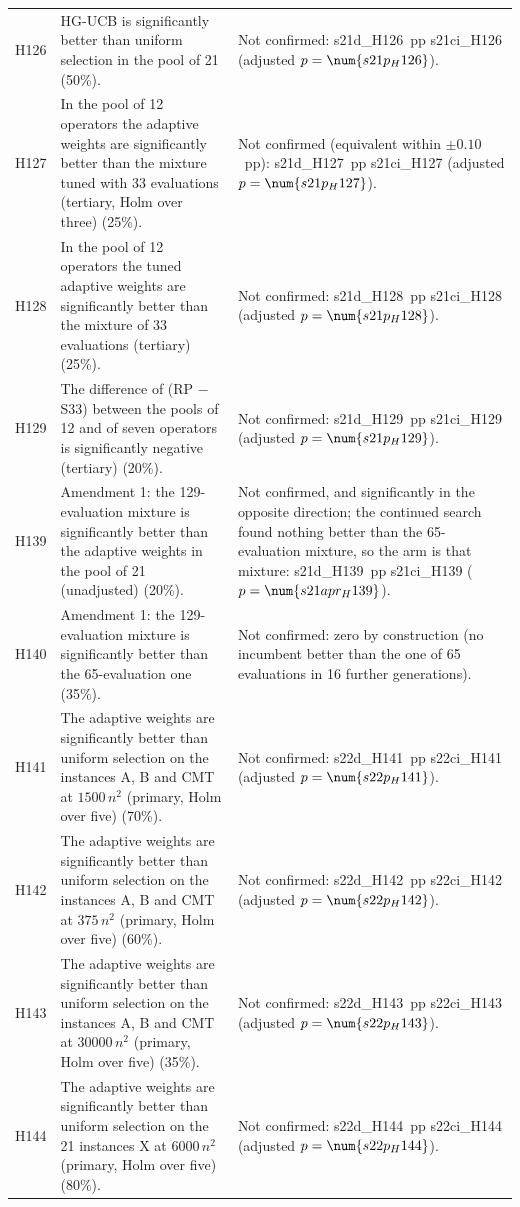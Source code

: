 \begin{center}
\begin{longtable}{>{\raggedright\arraybackslash}p{0.9cm}>{\raggedright\arraybackslash}p{5.2cm}>{\raggedright\arraybackslash}p{8.5cm}}
H126 & HG-UCB is significantly better than uniform selection in the pool of 21 (50\%). & Not confirmed: \num{s21d_H126}~pp \num{s21ci_H126} (adjusted $p=\num{s21p_H126}$). \\
H127 & In the pool of 12 operators the adaptive weights are significantly better than the mixture tuned with 33 evaluations (tertiary, Holm over three) (25\%). & Not confirmed (equivalent within $\pm0.10$~pp): \num{s21d_H127}~pp \num{s21ci_H127} (adjusted $p=\num{s21p_H127}$). \\
H128 & In the pool of 12 operators the tuned adaptive weights are significantly better than the mixture of 33 evaluations (tertiary) (25\%). & Not confirmed: \num{s21d_H128}~pp \num{s21ci_H128} (adjusted $p=\num{s21p_H128}$). \\
H129 & The difference of (RP $-$ S33) between the pools of 12 and of seven operators is significantly negative (tertiary) (20\%). & Not confirmed: \num{s21d_H129}~pp \num{s21ci_H129} (adjusted $p=\num{s21p_H129}$). \\
H139 & Amendment 1: the 129-evaluation mixture is significantly better than the adaptive weights in the pool of 21 (unadjusted) (20\%). & Not confirmed, and significantly in the opposite direction; the continued search found nothing better than the 65-evaluation mixture, so the arm is that mixture: \num{s21d_H139}~pp \num{s21ci_H139} ($p=\num{s21apr_H139}$). \\
H140 & Amendment 1: the 129-evaluation mixture is significantly better than the 65-evaluation one (35\%). & Not confirmed: zero by construction (no incumbent better than the one of 65 evaluations in 16 further generations). \\
H141 & The adaptive weights are significantly better than uniform selection on the instances A, B and CMT at $1500\,n^2$ (primary, Holm over five) (70\%). & Not confirmed: \num{s22d_H141}~pp \num{s22ci_H141} (adjusted $p=\num{s22p_H141}$). \\
H142 & The adaptive weights are significantly better than uniform selection on the instances A, B and CMT at $375\,n^2$ (primary, Holm over five) (60\%). & Not confirmed: \num{s22d_H142}~pp \num{s22ci_H142} (adjusted $p=\num{s22p_H142}$). \\
H143 & The adaptive weights are significantly better than uniform selection on the instances A, B and CMT at $30000\,n^2$ (primary, Holm over five) (35\%). & Not confirmed: \num{s22d_H143}~pp \num{s22ci_H143} (adjusted $p=\num{s22p_H143}$). \\
H144 & The adaptive weights are significantly better than uniform selection on the 21 instances X at $6000\,n^2$ (primary, Holm over five) (80\%). & Not confirmed: \num{s22d_H144}~pp \num{s22ci_H144} (adjusted $p=\num{s22p_H144}$). \\

\end{longtable}
\end{center}
